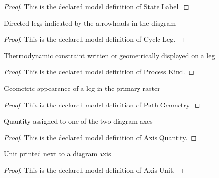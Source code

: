 \begin{proof}
  This is the declared model definition of State Label.
\end{proof}
\begin{definition}
  \label{def:physics:phyx-mini-0428:phyxminiproblems-problemphyxmini0428-cycleleg}
  Directed legs indicated by the arrowheads in the diagram
\end{definition}
\begin{proof}
  This is the declared model definition of Cycle Leg.
\end{proof}
\begin{definition}
  \label{def:physics:phyx-mini-0428:phyxminiproblems-problemphyxmini0428-processkind}
  Thermodynamic constraint written or geometrically displayed on a leg
\end{definition}
\begin{proof}
  This is the declared model definition of Process Kind.
\end{proof}
\begin{definition}
  \label{def:physics:phyx-mini-0428:phyxminiproblems-problemphyxmini0428-pathgeometry}
  Geometric appearance of a leg in the primary raster
\end{definition}
\begin{proof}
  This is the declared model definition of Path Geometry.
\end{proof}
\begin{definition}
  \label{def:physics:phyx-mini-0428:phyxminiproblems-problemphyxmini0428-axisquantity}
  Quantity assigned to one of the two diagram axes
\end{definition}
\begin{proof}
  This is the declared model definition of Axis Quantity.
\end{proof}
\begin{definition}
  \label{def:physics:phyx-mini-0428:phyxminiproblems-problemphyxmini0428-axisunit}
  Unit printed next to a diagram axis
\end{definition}
\begin{proof}
  This is the declared model definition of Axis Unit.
\end{proof}
